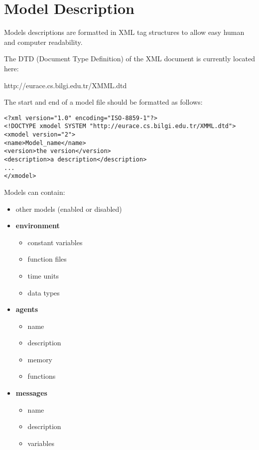 \section{Model Description}\label{model_description}

Models descriptions are formatted in XML tag structures to allow
easy human and computer readability.

The DTD (Document Type Definition) of the XML document is currently located
here:

http://eurace.cs.bilgi.edu.tr/XMML.dtd

The start and end of a model file should be formatted as follows:

\begin{mylisting}
\begin{verbatim}
<?xml version="1.0" encoding="ISO-8859-1"?>
<!DOCTYPE xmodel SYSTEM "http://eurace.cs.bilgi.edu.tr/XMML.dtd">
<xmodel version="2">
<name>Model_name</name>
<version>the version</version>
<description>a description</description>
...
</xmodel>
\end{verbatim}
\end{mylisting}

Models can contain:
\begin{itemize}
\item other models (enabled or disabled)
\item \textbf{environment}
\begin{itemize}
\item constant variables
\item function files
\item time units
\item data types
\end{itemize}
\item \textbf{agents}
\begin{itemize}
\item name
\item description
\item memory
\item functions
\end{itemize}
\item \textbf{messages}
\begin{itemize}
\item name
\item description
\item variables
\end{itemize}
\end{itemize}

